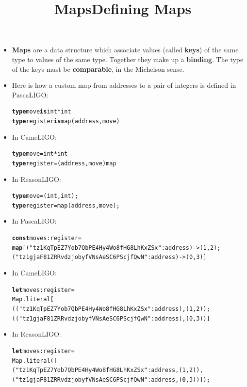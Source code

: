 \documentclass[wide]{slides}
\newcommand{\Kconst}[0]{\textbf{const}\xspace}
\newcommand{\Kis}[0]{\textbf{is}\xspace}
\newcommand{\Kmap}[0]{\textbf{map}\xspace}
\newcommand{\Ktype}[0]{\textbf{type}\xspace}
\newcommand{\Klet}[0]{\textbf{let}\xspace}
\begin{document}
\begin{slide}
  \title{Maps}

  \begin{itemize}

    \item \textbf{Maps} are a data structure which associate values
      (called \textbf{keys}) of the same type to values of the same
      type. Together they make up a \textbf{binding}. The type of the
      keys must be \textbf{comparable}, in the Michelson sense.

    \item Here is how a custom map from addresses to a pair of
      integers is defined in PascaLIGO:
      \begin{alltt}
\Ktype move \Kis int * int
\Ktype register \Kis map (address, move)
      \end{alltt}

    \item In CameLIGO:
      \begin{alltt}
\Ktype move = int * int
\Ktype register = (address, move) map
      \end{alltt}

    \item In ReasonLIGO:
      \begin{alltt}
\Ktype move = (int, int);
\Ktype register = map (address, move);
      \end{alltt}
  \end{itemize}

\end{slide}

\begin{slide}
  \title{Defining Maps}

  \begin{itemize}

    \item In PascaLIGO:
    \begin{alltt}
\Kconst moves : register =
  \Kmap [("tz1KqTpEZ7Yob7QbPE4Hy4Wo8fHG8LhKxZSx" : address) -> (1,2);
        ("tz1gjaF81ZRRvdzjobyfVNsAeSC6PScjfQwN" : address) -> (0,3)]
    \end{alltt}

    \item In CameLIGO:
      \begin{alltt}
\Klet moves : register =
  Map.literal [
    (("tz1KqTpEZ7Yob7QbPE4Hy4Wo8fHG8LhKxZSx" : address), (1,2));
    (("tz1gjaF81ZRRvdzjobyfVNsAeSC6PScjfQwN" : address), (0,3))]
      \end{alltt}

    \item In ReasonLIGO:
      \begin{alltt}
\Klet moves : register =
  Map.literal ([
    ("tz1KqTpEZ7Yob7QbPE4Hy4Wo8fHG8LhKxZSx" : address, (1,2)),
    ("tz1gjaF81ZRRvdzjobyfVNsAeSC6PScjfQwN" : address, (0,3))]);
      \end{alltt}

  \end{itemize}

\end{slide}
\end{document}
